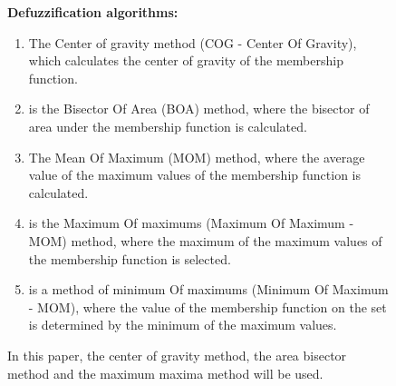 \documentclass{article}
\begin{document}
\begin{figure}[!t]
\begin{minipage}{0.49\textwidth}
            \textbf{Defuzzification algorithms:}
            \begin{enumerate}
                \item The Center of gravity method (COG - Center Of Gravity), which calculates the center of gravity of the membership function.
                \item is the Bisector Of Area (BOA) method, where the bisector of area under the membership function is calculated.
                \item The Mean Of Maximum (MOM) method, where the average value of the maximum values of the membership function is calculated.
                \item is the Maximum Of maximums (Maximum Of Maximum - MOM) method, where the maximum of the maximum values of the membership function is selected.
                \item is a method of minimum Of maximums (Minimum Of Maximum - MOM), where the value of the membership function on the set is determined by the minimum of the maximum values.
            \end{enumerate}
            In this paper, the center of gravity method, the area bisector method and the maximum maxima method will be used.
            ~\\
            ~\\
            ~\\
            ~\\
            ~\\
            ~\\
            ~\\
            ~\\
            ~\\
            ~\\
            ~\\
            ~\\
            ~\\
            ~\\
            ~\\
            ~\\
            ~\\
            ~\\
            ~\\
            ~\\
            ~\\
            ~\\
            ~\\
            ~\\

\end{minipage}
\end{figure}
\end{document}
